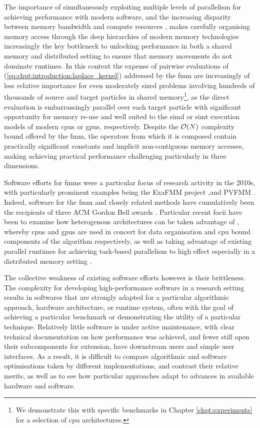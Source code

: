 The importance of simultaneously exploiting multiple levels of parallelism for achieving performance with modern software, and the increasing disparity between memory bandwidth and compute resources \cite{dongarra2017extreme}, makes carefully organising memory access through the deep hierarchies of modern memory technologies increasingly the key bottleneck to unlocking performance in both a shared memory and distributed setting to ensure that memory movements do not dominate runtimes. In this context the expense of pairwise evaluations of (\ref{eq:chpt:introduction:laplace_kernel}) addressed by the \acrshort{fmm} are increasingly of less relative importance for even moderately sized problems involving hundreds of thousands of source and target particles in shared memory\footnote{We demonstrate this with specific benchmarks in Chapter \ref{chpt:experiments} for a selection of \acrshort{cpu} architectures.}, as the direct evaluation is embarrassingly parallel over each target particle with significant opportunity for memory re-use and well suited to the \acrshort{simd} or \acrshort{simt} execution models of modern \glspl{cpu} or \glspl{gpu}, respectively. Despite the $\mathcal{O}(N)$ complexity bound offered by the \acrshort{fmm}, the operators from which it is composed contain practically significant constants and implicit non-contiguous memory accesses, making achieving practical performance challenging particularly in three dimensions.

Software efforts for \glspl{fmm} were a particular focus of research activity in the 2010s, with particularly prominent examples being the ExaFMM project \cite{barba2011exafmm, wang2021exafmm},and PVFMM \cite{malhotra2015pvfmm}. Indeed, software for the \acrshort{fmm} and closely related methods have cumulatively been the recipients of three ACM Gordon Bell awards \cite{bell2017look}. Particular recent focii have been to examine how heterogenous architectures can be taken advantage of \cite{malhotra2015pvfmm}, whereby \glspl{cpu} and \glspl{gpu} are used in concert for data organisation and \acrshort{cpu} bound components of the algorithm respectively, as well as taking advantage of existing parallel runtimes for achieving task-based parallelism to high effect especially in a distributed memory setting \cite{bramas2020tbfmm, agullo2014task}.

The collective weakness of existing software efforts however is their brittleness. The complexity for developing high-performance software in a research setting results in softwares that are strongly adapted for a particular algorithmic approach, hardware architecture, or runtime system, often with the goal of achieving a particular benchmark or demonstrating the utility of a particular technique. Relatively little software is under active maintenance, with clear technical documentation on how performance was achieved, and fewer still open their subcomponents for extension, have downstream users and simple user interfaces. As a result, it is difficult to compare algorithmic and software optimisations taken by different implementations, and contrast their relative merits, as well as to see how particular approaches adapt to advances in available hardware and software.

